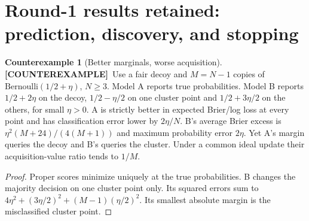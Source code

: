\documentclass[11pt]{article}
\theoremstyle{definition}
\newtheorem{example}[theorem]{Counterexample}
\newcommand{\1}{\mathbf 1}
\newcommand{\ce}{\textbf{[COUNTEREXAMPLE]}}
\begin{document}
\section{Round-1 results retained: prediction, discovery, and stopping}
\begin{example}[Better marginals, worse acquisition]\label{ex:prediction}
\ce\ Use a fair decoy and $M=N-1$ copies of
$\mathrm{Bernoulli}(1/2+\eta)$, $N\ge3$.
Model A reports true probabilities. Model B reports $1/2+2\eta$ on the
decoy, $1/2-\eta/2$ on one cluster point and $1/2+3\eta/2$ on the others,
for small $\eta>0$.
A is strictly better in expected Brier/log loss at every point and has
classification error lower by $2\eta/N$.
B's average Brier excess is $\eta^2(M+24)/(4(M+1))$ and maximum probability
error $2\eta$. Yet A's margin queries the decoy and B's queries the cluster.
Under a common ideal update their acquisition-value ratio tends to $1/M$.
\end{example}
\begin{proof}
Proper scores minimize uniquely at the true probabilities. B changes the
majority decision on one cluster point only. Its squared errors sum to
$4\eta^2+(3\eta/2)^2+(M-1)(\eta/2)^2$.
Its smallest absolute margin is the misclassified cluster point.
\end{proof}
\end{document}
